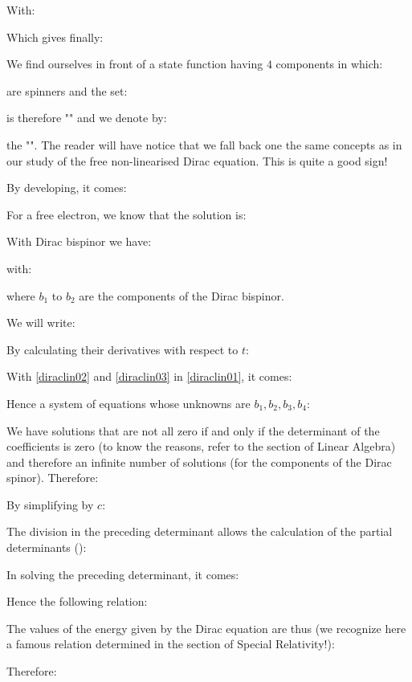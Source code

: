 	With:
	
	Which gives finally:
	
	We find ourselves in front of a state function having $4$ components in which:
	
	are spinners and the set:
	
	is therefore "" and we denote by:
	
	the "". The reader will have notice that we fall back one the same concepts as in our study of the free non-linearised Dirac equation. This is quite a good sign!
	
	By developing, it comes:
	
	For a free electron, we know that the solution is:
	
	With Dirac bispinor we have:
	
	with:
	
	where $b_1$ to $b_2$ are the components of the Dirac bispinor.
	
	We will write:
	
	By calculating their derivatives with respect to $t$:
	
	With \eqref{diraclin02} and \eqref{diraclin03} in \eqref{diraclin01}, it comes:
	
	Hence a system of equations whose unknowns are $b_1,b_2,b_3,b_4$:
	
	We have solutions that are not all zero if and only if the determinant of the coefficients is zero (to know the reasons, refer to the section of Linear Algebra) and therefore an infinite number of solutions (for the components of the Dirac spinor). Therefore:
	
	By simplifying by $c$:
	
	The division in the preceding determinant allows the calculation of the partial determinants ():
	
	In solving the preceding determinant, it comes:
	
	Hence the following relation:
	
	The values of the energy given by the Dirac equation are thus (we recognize here a famous relation determined in the section of Special Relativity!):
	
	Therefore:
	
